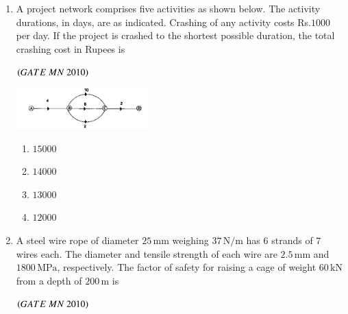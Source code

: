 \documentclass{article}
\begin{document}
\begin{enumerate}[label=Q.\arabic*., itemsep=1em, leftmargin=0pt, itemindent=*, labelsep=0.5em]
\begin{enumerate}[label=Q.\arabic*., start=17, leftmargin=2em]
\begin{enumerate}[label=Q.\arabic*., start=33, leftmargin=2em]
\begin{flushright}
\end{flushright}
\begin{multicols}{4}
\begin{enumerate}[label=(\Alph*),leftmargin=4em]
\item $-5$
\item $+5$
\item $-2$
\item $+2$
\end{enumerate}
\end{multicols}
\bigskip
\item A project network comprises five activities as shown below. The activity durations, in days, are as
indicated. Crashing of any activity costs Rs.$1000$ per day. If the project is crashed to the shortest
possible duration, the total crashing cost in Rupees is
\\
\begin{flushright}
\hfill$\left(GATE\ MN\ 2010\right)$
\end{flushright}
\begin{center}
\includegraphics[width=0.4\textwidth]{figs/43.png}
\end{center}
\begin{multicols}{4}
\begin{enumerate}[label=(\Alph*),leftmargin=4em]
\item $15000$
\item $14000$
\item $13000$
\item $ 12000$
\end{enumerate}
\end{multicols}
\bigskip
\item A steel wire rope of diameter $25\,\mathrm{mm}$ weighing $37\,\mathrm{N/m}$ has $6$ strands of $7$ wires each. 
The diameter and tensile strength of each wire are $2.5\,\mathrm{mm}$ and $1800\,\mathrm{MPa}$, respectively. 
The factor of safety for raising a cage of weight $60\,\mathrm{kN}$ from a depth of $200\,\mathrm{m}$ is
\\
\begin{flushright}
\hfill$\left(GATE\ MN\ 2010\right)$
\end{flushright}
\begin{multicols}{4}
\begin{enumerate}[label=(\Alph*),leftmargin=4em]

\end{enumerate}
\end{multicols}
\end{enumerate}
\end{enumerate}
\end{enumerate}
\end{document}
